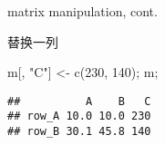 \documentclass[ignorenonframetext,]{beamer}
\newenvironment{Shaded}{\begin{snugshade}}{\end{snugshade}}
\newcommand{\DecValTok}[1]{\textcolor[rgb]{0.00,0.00,0.81}{#1}}
\newcommand{\FunctionTok}[1]{\textcolor[rgb]{0.00,0.00,0.00}{#1}}
\newcommand{\NormalTok}[1]{#1}
\newcommand{\OtherTok}[1]{\textcolor[rgb]{0.56,0.35,0.01}{#1}}
\newcommand{\StringTok}[1]{\textcolor[rgb]{0.31,0.60,0.02}{#1}}
\newcommand\FontSmall{\fontsize{7}{8}\selectfont}
\begin{document}
\begin{frame}[fragile]{matrix manipulation, cont.}
\protect\hypertarget{matrix-manipulation-cont.-4}{}
\begin{block}{替换一列}
\protect\hypertarget{ux66ffux6362ux4e00ux5217}{}
\FontSmall

\begin{Shaded}
\begin{Highlighting}[]
\NormalTok{m[, }\StringTok{"C"}\NormalTok{] }\OtherTok{\textless{}{-}} \FunctionTok{c}\NormalTok{(}\DecValTok{230}\NormalTok{, }\DecValTok{140}\NormalTok{);}
\NormalTok{m;}
\end{Highlighting}
\end{Shaded}

\begin{verbatim}
##          A    B   C
## row_A 10.0 10.0 230
## row_B 30.1 45.8 140
\end{verbatim}
\end{block}
\end{frame}
\end{document}
